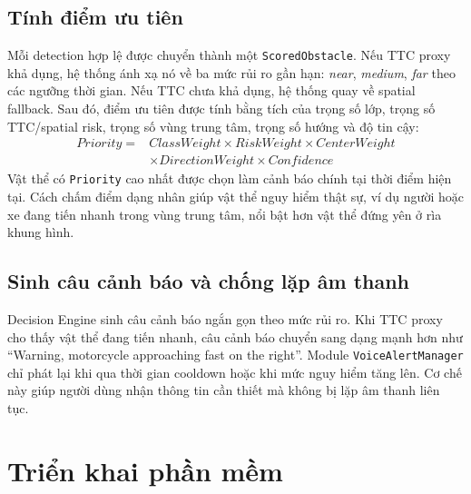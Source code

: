 \documentclass[twoside,final]{hcmut-report}
\begin{document}
\subsection{Tính điểm ưu tiên}
Mỗi detection hợp lệ được chuyển thành một \texttt{ScoredObstacle}. Nếu TTC proxy khả dụng, hệ thống ánh xạ nó về ba mức rủi ro gần hạn: \textit{near}, \textit{medium}, \textit{far} theo các ngưỡng thời gian. Nếu TTC chưa khả dụng, hệ thống quay về spatial fallback. Sau đó, điểm ưu tiên được tính bằng tích của trọng số lớp, trọng số TTC/spatial risk, trọng số vùng trung tâm, trọng số hướng và độ tin cậy:
\[
\begin{aligned}
Priority ={}& ClassWeight \times RiskWeight \times CenterWeight \\
            & \times DirectionWeight \times Confidence
\end{aligned}
\]
Vật thể có \texttt{Priority} cao nhất được chọn làm cảnh báo chính tại thời điểm hiện tại. Cách chấm điểm dạng nhân giúp vật thể nguy hiểm thật sự, ví dụ người hoặc xe đang tiến nhanh trong vùng trung tâm, nổi bật hơn vật thể đứng yên ở rìa khung hình.

\subsection{Sinh câu cảnh báo và chống lặp âm thanh}
Decision Engine sinh câu cảnh báo ngắn gọn theo mức rủi ro. Khi TTC proxy cho thấy vật thể đang tiến nhanh, câu cảnh báo chuyển sang dạng mạnh hơn như ``Warning, motorcycle approaching fast on the right''. Module \texttt{VoiceAlertManager} chỉ phát lại khi qua thời gian cooldown hoặc khi mức nguy hiểm tăng lên. Cơ chế này giúp người dùng nhận thông tin cần thiết mà không bị lặp âm thanh liên tục.

\section{Triển khai phần mềm}
\end{document}
